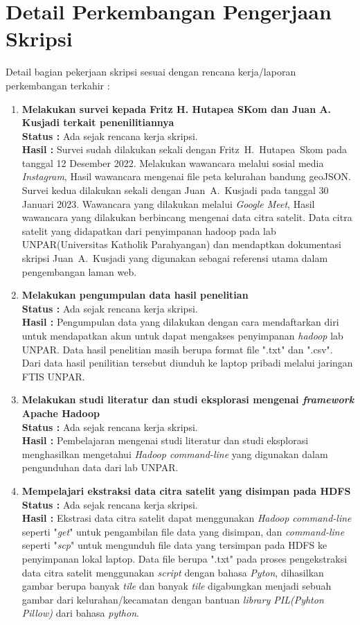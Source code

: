 \documentclass[a4paper,twoside]{article}
\begin{document}
\section{Detail Perkembangan Pengerjaan Skripsi}
Detail bagian pekerjaan skripsi sesuai dengan rencana kerja/laporan perkembangan terkahir :
	\begin{enumerate}
		\item \textbf {Melakukan survei kepada Fritz H. Hutapea SKom dan Juan A. Kusjadi terkait penenilitiannya}\\
		{\bf Status :} Ada sejak rencana kerja skripsi.\\
		{\bf Hasil :} Survei sudah dilakukan sekali dengan Fritz~H.~Hutapea~Skom pada tanggal 12 Desember 2022. Melakukan wawancara melalui sosial media \textit{Instagram}, Hasil wawancara mengenai file peta kelurahan bandung geoJSON. Survei kedua dilakukan sekali dengan Juan~A.~Kusjadi pada tanggal 30 Januari 2023. Wawancara yang dilakukan melalui \textit{Google Meet}, Hasil wawancara yang dilakukan berbincang mengenai data citra satelit. Data citra satelit yang didapatkan dari penyimpanan hadoop pada lab UNPAR(Universitas Katholik Parahyangan) dan mendaptkan dokumentasi skripsi Juan~A.~Kusjadi yang digunakan sebagai referensi utama dalam pengembangan laman web.
		
		\item \textbf{ Melakukan pengumpulan data hasil penelitian}\\
		{\bf Status :} Ada sejak rencana kerja skripsi.\\
		{\bf Hasil :} Pengumpulan data yang dilakukan dengan cara mendaftarkan diri untuk mendapatkan akun untuk dapat mengakses penyimpanan \textit{hadoop} lab UNPAR. Data hasil penelitian masih berupa format file ".txt" dan ".csv". Dari data hasil penilitian tersebut diunduh ke laptop pribadi melalui jaringan FTIS UNPAR.
		
		\item \textbf{Melakukan studi literatur dan studi eksplorasi mengenai \textit{framework} Apache Hadoop}\\
		{\bf Status :} Ada sejak rencana kerja skripsi.\\
		{\bf Hasil :} Pembelajaran mengenai studi literatur dan studi eksplorasi menghasilkan mengetahui \textit{Hadoop command-line} yang digunakan dalam pengunduhan data dari lab UNPAR.
		
		\item \textbf{Mempelajari ekstraksi data citra satelit yang disimpan pada HDFS}\\
		{\bf Status :} Ada sejak rencana kerja skripsi.\\
		{\bf Hasil :} Ekstrasi data citra satelit dapat menggunakan \textit{Hadoop command-line} seperti "\textit{get}" untuk pengambilan file data yang disimpan, dan \textit{command-line} seperti "\textit{scp}" untuk mengunduh file data yang tersimpan pada HDFS ke penyimpanan lokal laptop. Data file berupa ".txt" pada proses pengekstraksi data citra satelit menggunakan \textit{script} dengan bahasa \textit{Pyton}, dihasilkan gambar berupa banyak \textit{tile} dan banyak \textit{tile} digabungkan menjadi sebuah gambar dari kelurahan/kecamatan dengan bantuan \textit{library PIL(Pyhton Pillow)} dari bahasa \textit{python}.


\end{enumerate}
\end{document}
